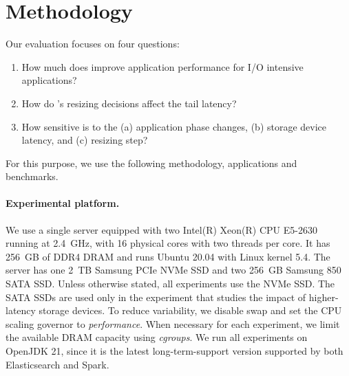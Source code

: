 \section{Methodology}
\label{flexheap:sec:methodology}

Our evaluation focuses on four questions:

\begin{enumerate}
	\item How much does \flexheapName{} improve application performance for I/O intensive applications?

	\item How do \flexheapName{}’s resizing decisions affect the tail latency?

	\item How sensitive is \flexheapName{} to the (a) application phase changes, (b) storage device latency, and (c) resizing step?

\end{enumerate}

For this purpose, we use the following methodology, applications and benchmarks.

\paragraph{\textbf{Experimental platform.}}
We use a single server equipped with two Intel(R) Xeon(R) CPU E5-2630 running at \SI{2.4}{GHz}, with 16 physical cores with two threads per core.
It has \SI{256}{GB} of DDR4 DRAM and runs Ubuntu 20.04 with Linux kernel 5.4.
The server has one \SI{2}{TB} Samsung PCIe NVMe SSD and two \SI{256}{GB} Samsung 850 SATA SSD.
Unless otherwise stated, all experiments use the NVMe SSD.
The SATA SSDs are used only in the experiment that studies the impact of higher-latency storage devices.
To reduce variability, we disable swap and set the CPU scaling governor to \emph{performance}.
When necessary for each experiment, we limit the available DRAM capacity using \emph{cgroups}.
We run all experiments on OpenJDK 21, since it is the latest long-term-support version supported by both Elasticsearch and Spark.



